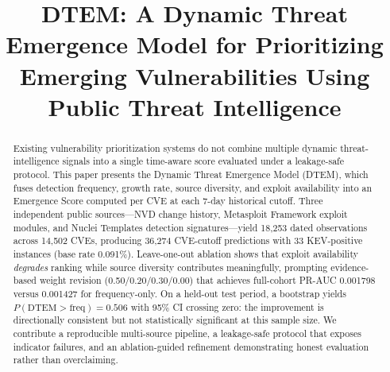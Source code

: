 \documentclass[conference]{IEEEtran}
\begin{document}
\title{DTEM: A Dynamic Threat Emergence Model for Prioritizing Emerging Vulnerabilities Using Public Threat Intelligence}
\author{
\and
{}
\and
{}
}

\maketitle
\begin{abstract}
Existing vulnerability prioritization systems do not combine multiple dynamic threat-intelligence signals into a single time-aware score evaluated under a leakage-safe protocol. This paper presents the Dynamic Threat Emergence Model (DTEM), which fuses detection frequency, growth rate, source diversity, and exploit availability into an Emergence Score computed per CVE at each 7-day historical cutoff. Three independent public sources---NVD change history, Metasploit Framework exploit modules, and Nuclei Templates detection signatures---yield 18{,}253 dated observations across 14{,}502 CVEs, producing 36{,}274 CVE-cutoff predictions with 33 KEV-positive instances (base rate 0.091\%). Leave-one-out ablation shows that exploit availability \emph{degrades} ranking while source diversity contributes meaningfully, prompting evidence-based weight revision (0.50/0.20/0.30/0.00) that achieves full-cohort PR-AUC 0.001798 versus 0.001427 for frequency-only. On a held-out test period, a bootstrap yields $P(\text{DTEM}>\text{freq}) = 0.506$ with 95\% CI crossing zero: the improvement is directionally consistent but not statistically significant at this sample size. We contribute a reproducible multi-source pipeline, a leakage-safe protocol that exposes indicator failures, and an ablation-guided refinement demonstrating honest evaluation rather than overclaiming.

\end{abstract}
\end{document}
